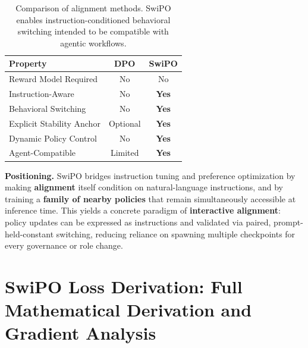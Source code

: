 \vspace{-2mm}
\begin{table}[ht!]
\centering
\small
\renewcommand{\arraystretch}{1.2}
\begin{tabular}{@{}lcc@{}}
\toprule
\textbf{Property} & \textbf{DPO} & \textbf{SwiPO} \\
\midrule
Reward Model Required & No & No \\ \hline
Instruction-Aware & No & \textbf{Yes} \\ \hline
Behavioral Switching & No & \textbf{Yes} \\ \hline
Explicit Stability Anchor & Optional & \textbf{Yes} \\ \hline
Dynamic Policy Control & No & \textbf{Yes} \\ \hline
Agent-Compatible & Limited & \textbf{Yes} \\
\bottomrule
\end{tabular}
\caption{Comparison of alignment methods. SwiPO enables instruction-conditioned behavioral switching intended to be compatible with agentic workflows.}
\label{tab:method_comparison}
\vspace{-4mm}
\end{table}

\noindent\textbf{Positioning.}
SwiPO bridges instruction tuning and preference optimization by making \textbf{alignment} itself condition on natural-language instructions, and by training a \textbf{family of nearby policies} that remain simultaneously accessible at inference time. This yields a concrete paradigm of \textbf{interactive alignment}: policy updates can be expressed as instructions and validated via paired, prompt-held-constant switching, reducing reliance on spawning multiple checkpoints for every governance or role change.





\section{SwiPO Loss Derivation: Full Mathematical Derivation and Gradient Analysis}
\label{sec:appendix_cita_kl}

\vspace{-0.35em}
